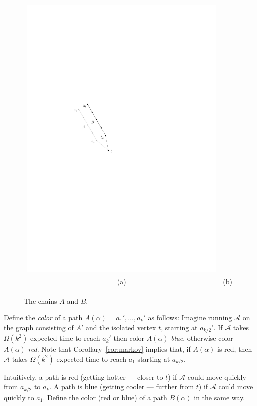 \documentclass [letterpaper] {patmorin}
\begin{document}
\begin{figure}
\begin{center}
\begin{tabular}{cc}
      \includegraphics{pics/bchain} \\
      (a) & (b)
    \end{tabular}
  \end{center}
  \caption{The chains $A$ and $B$.}
  \label{fig:ab}
\end{figure}

Define the \emph{color} of a path $A(\alpha)=a_1',\ldots,a_k'$ as
follows: Imagine running $\mathcal{A}$ on the graph consisting of $A'$
and the isolated vertex $t$, starting at $a_{k/2}'$.  If $\mathcal{A}$
takes $\Omega (k^{2})$ expected time to reach $a_k'$ then color
$A(\alpha)$ \emph{blue}, otherwise color $A(\alpha)$ \emph{red}.
Note that Corollary~\ref{cor:markov} implies that, if $A(\alpha)$ is red,
then $\mathcal{A}$ takes $\Omega(k^2)$ expected time to reach $a_1$
starting at $a_{k/2}$.

Intuitively, a path is red (getting hotter --- closer to $t$) if
$\mathcal{A}$ could move quickly from $a_{k/2}$ to $a_k$.  A path is blue (getting cooler --- further from $t$) if $\mathcal{A}$ could move quickly to $a_1$.  Define the color (red or blue) of a path $B(\alpha)$ in the same way.
\end{document}
